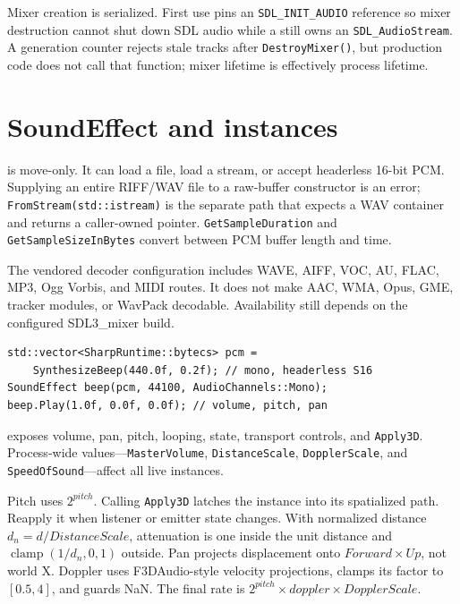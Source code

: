 Mixer creation is serialized. First use pins an \texttt{SDL\_INIT\_AUDIO} reference so mixer
destruction cannot shut down SDL audio while a  still owns
an \texttt{SDL\_AudioStream}. A generation counter rejects stale tracks after
\texttt{DestroyMixer()}, but production code does not call that function; mixer lifetime is
effectively process lifetime.

\section{SoundEffect and instances}

 is move-only. It can load a file, load a stream, or accept headerless
16-bit PCM. Supplying an entire RIFF/WAV file to a raw-buffer constructor is an error;
\texttt{FromStream(std::istream)} is the separate path that expects a WAV container and returns
a caller-owned pointer. \texttt{GetSampleDuration} and \texttt{GetSampleSizeInBytes} convert
between PCM buffer length and time.

The vendored decoder configuration includes WAVE, AIFF, VOC, AU, FLAC, MP3, Ogg Vorbis, and
MIDI routes. It does not make AAC, WMA, Opus, GME, tracker modules, or WavPack decodable.
Availability still depends on the configured SDL3\_mixer build.

\begin{lstlisting}
std::vector<SharpRuntime::bytecs> pcm =
    SynthesizeBeep(440.0f, 0.2f); // mono, headerless S16
SoundEffect beep(pcm, 44100, AudioChannels::Mono);
beep.Play(1.0f, 0.0f, 0.0f); // volume, pitch, pan
\end{lstlisting}

 exposes volume, pan, pitch, looping, state, transport controls,
and \texttt{Apply3D}. Process-wide  values---\texttt{MasterVolume},
\texttt{DistanceScale}, \texttt{DopplerScale}, and \texttt{SpeedOfSound}---affect all live
instances.

Pitch uses $2^{pitch}$. Calling \texttt{Apply3D} latches the instance into its spatialized
path. Reapply it when listener or emitter state changes. With normalized distance
$d_n=d/DistanceScale$, attenuation is one inside the unit distance and
$\operatorname{clamp}(1/d_n,0,1)$ outside. Pan projects displacement onto
$Forward\times Up$, not world X. Doppler uses F3DAudio-style velocity projections, clamps its
factor to $[0.5,4]$, and guards NaN. The final rate is
$2^{pitch}\times doppler\times DopplerScale$.

